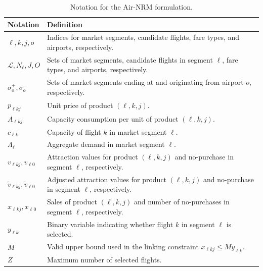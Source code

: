\documentclass[11pt]{article}
\begin{document}
\begin{enumerate}[label=(R1.Major.\arabic*),leftmargin=*]
\begin{table}[!htbp]
\centering
\caption{Notation for the Air-NRM formulation.}
\label{tab:air-nrm-notation-response}
\begin{tabular}{p{} p{}}
\toprule
\textbf{Notation} & \textbf{Definition} \\
\midrule
$\ell, k, j, o$
& Indices for market segments, candidate flights, fare types, and airports, respectively. \\

$\mathcal{L}, N_\ell, J, O$
& Sets of market segments, candidate flights in segment $\ell$, fare types, and airports, respectively. \\

$\sigma_o^+, \sigma_o^-$
& Sets of market segments ending at and originating from airport $o$, respectively. \\

$p_{\ell kj}$
& Unit price of product $(\ell,k,j)$. \\

$A_{\ell kj}$
& Capacity consumption per unit of product $(\ell,k,j)$. \\

$c_{\ell k}$
& Capacity of flight $k$ in market segment $\ell$. \\

$\Lambda_\ell$
& Aggregate demand in market segment $\ell$. \\

$v_{\ell kj}, v_{\ell0}$
& Attraction values for product $(\ell,k,j)$ and no-purchase in segment $\ell$, respectively. \\

$\widetilde{v}_{\ell kj}, \widetilde{v}_{\ell0}$
& Adjusted attraction values for product $(\ell,k,j)$ and no-purchase in segment $\ell$, respectively. \\

$x_{\ell kj}, x_{\ell0}$
& Sales of product $(\ell,k,j)$ and number of no-purchases in segment $\ell$, respectively. \\

$y_{\ell k}$
& Binary variable indicating whether flight $k$ in segment $\ell$ is selected. \\

$M$
& Valid upper bound used in the linking constraint
$x_{\ell kj}\leq M y_{\ell k}$. \\

$Z$
& Maximum number of selected flights. \\
\bottomrule
\end{tabular}
\end{table}


\end{enumerate}
\end{document}
